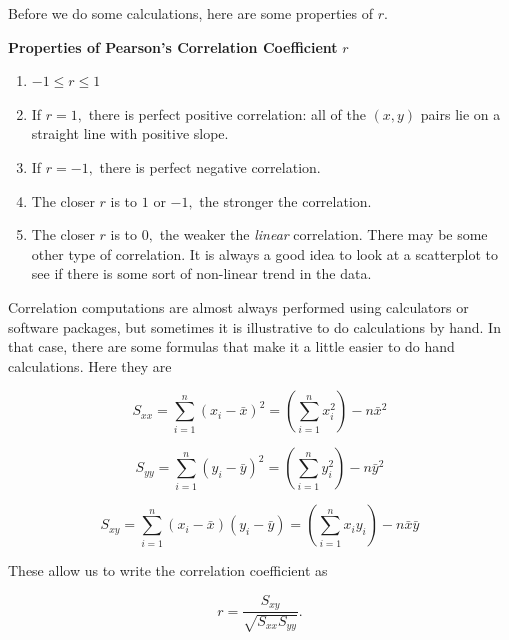 \documentclass[
]{book}
\theoremstyle{definition}
\theoremstyle{definition}
\theoremstyle{definition}
\theoremstyle{definition}
\theoremstyle{remark}
\begin{document}
Before we do some calculations, here are some properties of \(r.\)

\begin{propbox}

\textbf{Properties of Pearson's Correlation Coefficient} \(r\)

\begin{enumerate}
\def\labelenumi{\arabic{enumi}.}
\item
  \(-1\leq r\leq 1\)
\item
  If \(r=1,\) there is perfect positive correlation: all of the \((x,y)\) pairs lie on a straight line with positive slope.
\item
  If \(r=-1,\) there is perfect negative correlation.
\item
  The closer \(r\) is to \(1\) or \(-1,\) the stronger the correlation.
\item
  The closer \(r\) is to \(0,\) the weaker the \emph{linear} correlation. There may be some other type of correlation. It is always a good idea to look at a scatterplot to see if there is some sort of non-linear trend in the data.
\end{enumerate}

\end{propbox}

Correlation computations are almost always performed using calculators or software packages, but sometimes it is illustrative to do calculations by hand. In that case, there are some formulas that make it a little easier to do hand calculations. Here they are

\begin{equation}
S_{xx}=\sum_{i=1}^n(x_i-\bar{x})^2=\left(\sum_{i=1}^n x_i^2\right)-n\bar{x}^2
\label{eq:Sxx}
\end{equation}

\begin{equation}
S_{yy}=\sum_{i=1}^n(y_i-\bar{y})^2=\left(\sum_{i=1}^n y_i^2\right)-n\bar{y}^2
\label{eq:Syy}
\end{equation}

\begin{equation}
S_{xy}=\sum_{i=1}^n (x_i-\bar{x})(y_i-\bar{y})=\left(\sum_{i=1}^n x_iy_i\right)-n\bar{x}\bar{y} 
\label{eq:Sxy}
\end{equation}

These allow us to write the correlation coefficient as

\begin{equation}
r=\frac{S_{xy}}{\sqrt{S_{xx}S_{yy}}}.
\label{eq:PCC}
\end{equation}
\end{document}
